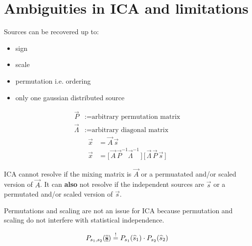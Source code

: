 \section{Ambiguities in ICA and limitations}
\begin{frame}

Sources can be recovered up to:
\begin{itemize}
\item sign
\item scale
\item permutation i.e. ordering
\item only one gaussian distributed source
\end{itemize}
\begin{align*}
\vec P &:= \text{arbitrary permutation matrix}\\
\vec \Lambda &:= \text{arbitrary diagonal matrix}
\end{align*}
\begin{align}
\vec x &= \vec A \, \vec s\\
\vec x &= \lbrack \, \vec A\, \vec P^{-1} \vec \Lambda^{-1}\, \rbrack \, \lbrack \, \vec \Lambda \, \vec P \, \vec s\, \rbrack
\end{align}

\end{frame}



ICA cannot resolve if the mixing matrix is $\vec A$ or a permuatated and/or scaled version of $\vec A$.
It can \textbf{also} not resolve if the independent sources are $\vec s$ or a permutated and/or scaled version of $\vec s$.

Permutations and scaling are not an issue for ICA because permutation and scaling do not interfere with statistical independence.

$$
P_{s_1, s_2}(\widehat {\underline{\mathbf{s}}}) \stackrel{\mathrm{!}}{=}  P_{s_1} (\widehat{s}_1) \cdot P_{s_2} (\widehat{s}_2)
$$

